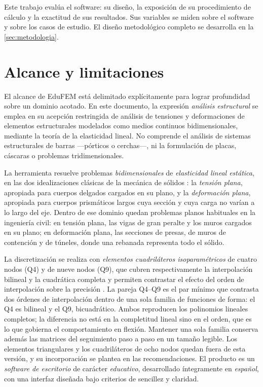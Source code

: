 Este trabajo evalúa el software: su diseño, la exposición de su procedimiento de cálculo y la exactitud de sus resultados. Sus variables se miden sobre el software y sobre los casos de estudio. El diseño metodológico completo se desarrolla en la \autoref{sec:metodologia}.

\section*{Alcance y limitaciones}

El alcance de EduFEM está delimitado explícitamente para lograr profundidad sobre un dominio acotado. En este documento, la expresión \emph{análisis estructural} se emplea en su acepción restringida de análisis de tensiones y deformaciones de elementos estructurales modelados como medios continuos bidimensionales, mediante la teoría de la elasticidad lineal. No comprende el análisis de sistemas estructurales de barras —pórticos o cerchas—, ni la formulación de placas, cáscaras o problemas tridimensionales.

La herramienta resuelve problemas \emph{bidimensionales} de \emph{elasticidad lineal estática}, en las dos idealizaciones clásicas de la mecánica de sólidos \autocite[p.~11]{timoshenko1970elasticity}: la \emph{tensión plana}, apropiada para cuerpos delgados cargados en su plano, y la \emph{deformación plana}, apropiada para cuerpos prismáticos largos cuya sección y cuya carga no varían a lo largo del eje. Dentro de ese dominio quedan problemas planos habituales en la ingeniería civil: en tensión plana, las vigas de gran peralte y los muros cargados en su plano; en deformación plana, las secciones de presas, de muros de contención y de túneles, donde una rebanada representa todo el sólido.

La discretización se realiza con \emph{elementos cuadriláteros isoparamétricos} de cuatro nodos (Q4) y de nueve nodos (Q9), que cubren respectivamente la interpolación bilineal y la cuadrática completa y permiten contrastar el efecto del orden de interpolación sobre la precisión \autocites[pp.~137-138]{hughes2000fem}[pp.~164, 183-184]{onate2009structural}. La pareja Q4--Q9 es el par mínimo que contrasta dos órdenes de interpolación dentro de una sola familia de funciones de forma: el Q4 es bilineal y el Q9, bicuadrático. Ambos reproducen los polinomios lineales completos; la diferencia no está en la completitud lineal sino en el orden, que es lo que gobierna el comportamiento en flexión. Mantener una sola familia conserva además las matrices del seguimiento paso a paso en un tamaño legible. Los elementos triangulares y los cuadriláteros de ocho nodos quedan fuera de esta versión, y su incorporación se plantea en las recomendaciones. El producto es un \emph{software de escritorio} de carácter \emph{educativo}, desarrollado íntegramente en \emph{español}, con una interfaz diseñada bajo criterios de sencillez y claridad.


